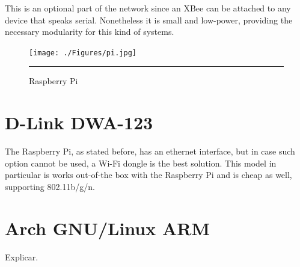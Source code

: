 This is an optional part of the network since an XBee can be attached to any device that speaks serial. Nonetheless it is small and low-power, providing the necessary modularity for this kind of systems.

\begin{figure}[htbp]
    \centering
    \texttt{[image: ./Figures/pi.jpg]}
        \rule{35em}{0.5pt}
        \caption[Raspberry Pi]{Raspberry Pi}
    \label{fig:RaspberryPi}
\end{figure}


\section{D-Link DWA-123}

The Raspberry Pi, as stated before, has an ethernet interface, but in case such option cannot be used, a Wi-Fi dongle is the best solution. This model in particular is works out-of-the box with the Raspberry Pi and is cheap as well, supporting 802.11b/g/n.


\section{Arch GNU/Linux ARM}
Explicar.
